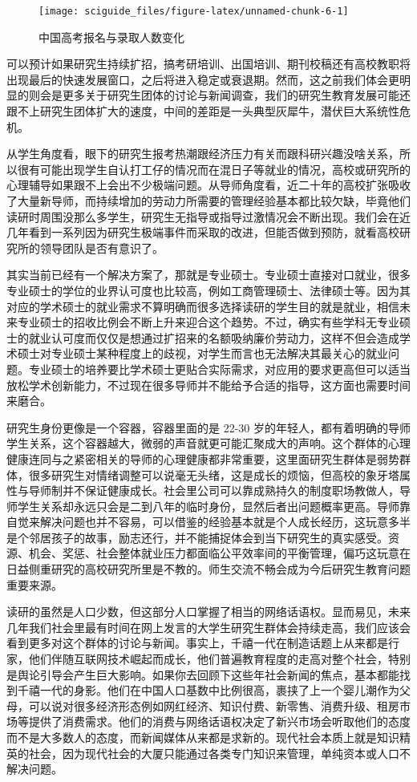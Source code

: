 \documentclass[]{tufte-book}
\begin{document}
\begin{figure}
\texttt{[image: sciguide\_files/figure-latex/unnamed-chunk-6-1]} \caption[中国高考报名与录取人数变化]{中国高考报名与录取人数变化}\label{fig:unnamed-chunk-6}
\end{figure}

可以预计如果研究生持续扩招，搞考研培训、出国培训、期刊校稿还有高校教职将出现最后的快速发展窗口，之后将进入稳定或衰退期。然而，这之前我们体会更明显的则会是更多关于研究生团体的讨论与新闻调查，我们的研究生教育发展可能还跟不上研究生团体扩大的速度，中间的差距是一头典型灰犀牛，潜伏巨大系统性危机。

从学生角度看，眼下的研究生报考热潮跟经济压力有关而跟科研兴趣没啥关系，所以很有可能出现学生自认打工仔的情况而在混日子等就业的情况，高校或研究所的心理辅导如果跟不上会出不少极端问题。从导师角度看，近二十年的高校扩张吸收了大量新导师，而持续增加的劳动力所需要的管理经验基本都比较欠缺，毕竟他们读研时周围没那么多学生，研究生无指导或指导过激情况会不断出现。我们会在近几年看到一系列因为研究生极端事件而采取的改进，但能否做到预防，就看高校研究所的领导团队是否有意识了。

其实当前已经有一个解决方案了，那就是专业硕士。专业硕士直接对口就业，很多专业硕士的学位的业界认可度也比较高，例如工商管理硕士、法律硕士等。因为其对应的学术硕士的就业需求不算明确而很多选择读研的学生目的就是就业，相信未来专业硕士的招收比例会不断上升来迎合这个趋势。不过，确实有些学科无专业硕士的就业认可度而仅仅是想通过扩招来的名额吸纳廉价劳动力，这样不但会造成学术硕士对专业硕士某种程度上的歧视，对学生而言也无法解决其最关心的就业问题。专业硕士的培养要比学术硕士更贴合实际需求，对应用的要求更高但可以适当放松学术创新能力，不过现在很多导师并不能给予合适的指导，这方面也需要时间来磨合。

研究生身份更像是一个容器，容器里面的是 22-30 岁的年轻人，都有着明确的导师学生关系，这个容器越大，微弱的声音就更可能汇聚成大的声响。这个群体的心理健康连同与之紧密相关的导师的心理健康都非常重要，这里面研究生群体是弱势群体，很多研究生对情绪调整可以说毫无头绪，这是成长的烦恼，但高校的象牙塔属性与导师制并不保证健康成长。社会里公司可以靠成熟持久的制度职场教做人，导师学生关系却永远只会是二到八年的临时身份，显然后者出问题概率更高。导师靠自觉来解决问题也并不容易，可以借鉴的经验基本就是个人成长经历，这玩意多半是个邻居孩子的故事，励志还行，并不能捕捉体会到当下研究生的真实感受。资源、机会、奖惩、社会整体就业压力都面临公平效率间的平衡管理，偏巧这玩意在日益侧重研究的高校研究所里是不教的。师生交流不畅会成为今后研究生教育问题重要来源。

读研的虽然是人口少数，但这部分人口掌握了相当的网络话语权。显而易见，未来几年我们社会里最有时间在网上发言的大学生研究生群体会持续走高，我们应该会看到更多对这个群体的讨论与新闻。事实上，千禧一代在制造话题上从来都是行家，他们伴随互联网技术崛起而成长，他们普遍教育程度的走高对整个社会，特别是舆论引导会产生巨大影响。如果你去回顾下这些年社会新闻的焦点，基本都能找到千禧一代的身影。他们在中国人口基数中比例很高，裹挟了上一个婴儿潮作为父母，可以说对很多经济形态例如网红经济、知识付费、新零售、消费升级、租房市场等提供了消费需求。他们的消费与网络话语权决定了新兴市场会听取他们的态度而不是大多数人的态度，而新闻媒体从来都是求新的。现代社会本质上就是知识精英的社会，因为现代社会的大厦只能通过各类专门知识来管理，单纯资本或人口不解决问题。
\end{document}
